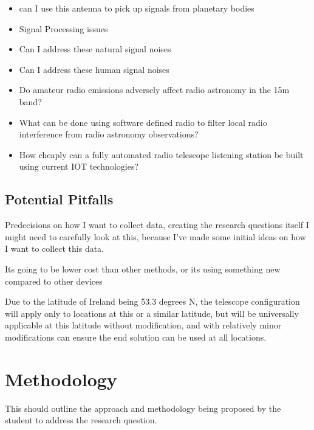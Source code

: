 \documentclass[runningheads,a4paper]{llncs}
\begin{document}
\begin{itemize}
  \item can I use this antenna to pick up signals from planetary bodies
  \item Signal Processing issues
  \item Can I address these natural signal noises
  \item Can I address these human signal noises
\end{itemize}

\begin{itemize}
  \item Do amateur radio emissions adversely affect radio astronomy in the 15m band?
  \item What can be done using software defined radio to filter local radio interference from radio astronomy observations?
  \item How cheaply can a fully automated radio telescope listening station be built using current IOT technologies?
\end{itemize}

%
%
\subsection*{Potential Pitfalls}
Predecisions on how I want to collect data, creating the research questions itself I might need to carefully look at this, because I've made some initial ideas on how I want to collect this data.

Its going to be lower cost than other methods, or its using something new compared to other devices

Due to the latitude of Ireland being 53.3 degrees N, the telescope configuration will apply only to locations at this or a similar latitude, but will be universally applicable at this latitude without modification, and with relatively minor modifications can ensure the end solution can be used at all locations. \cite{kivelson96}

%
%
\newpage
\section*{Methodology}
This should outline the approach and methodology being proposed by the student to address the research question.
\end{document}
